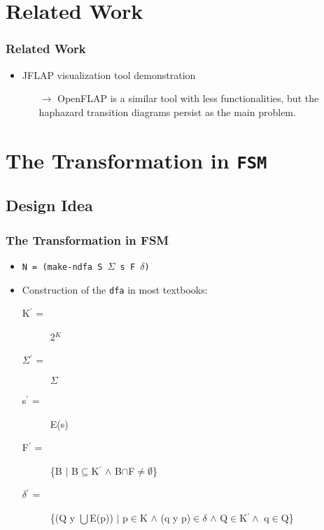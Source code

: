 \documentclass{beamer}
\newcommand{\fsm}{\texttt{FSM}}
\newcommand{\arrow}{\(\rightarrow\)}
\newcommand{\sig}{\texttt{\(\Sigma\)}}
\newcommand{\delt}{\texttt{\(\delta\)}}
\begin{document}
\section{Related Work}

\begin{frame}[fragile]
\frametitle{Related Work}
\begin{large}
\begin{itemize}
\item<1-> JFLAP visualization tool demonstration

\begin{itemize}

\item[\arrow] OpenFLAP is a similar tool with less functionalities, but the haphazard transition diagrams persist as the main problem.

\end{itemize}

\end{itemize}
\end{large}
\end{frame}




\section{The Transformation in \fsm}
\subsection{Design Idea}



\begin{frame}[fragile]
\frametitle{The Transformation in FSM}
\begin{scriptsize}
\begin{itemize}
\normalsize
\item<1->  \texttt{N = (make-ndfa S \sig{} s F \delt)}

\item<1->

Construction of the \texttt{dfa} in most textbooks:
\begin{description}
  \item [K$^{\prime}$ = ] 2$^K$
  \item[\sig{}$^{\prime}$ =] \sig{}
  \item[s$^{\prime}$ =] E(s)
  \item[F$^{\prime}$ =] \{B $|$ B$\subseteq$K$^{\prime}$ $\wedge$ B$\cap$F$\neq \emptyset$\}
  \item[\delt{}$^{\prime}$ =] \{(Q y $\bigcup$E(p)) $|$ p$\in$K $\wedge$ (q y p)$\in$\delt{} $\wedge$ Q$\in$K$^{\prime} \wedge$ q$\in$Q\} \newline
\end{description}
\end{itemize}
\end{scriptsize}
\end{frame}
\end{document}
